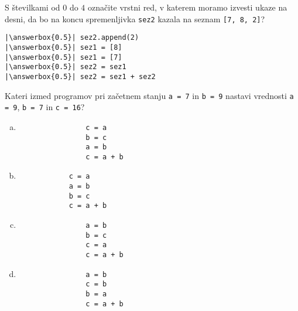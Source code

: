 \documentclass[arhiv, 10pt]{../izpit}
\newcommand{\inlinepy}[1]{\texttt{#1}}
\newcommand{\answerbox}[1]{\framebox{\vphantom{\large M}\hspace{#1cm}}}
\begin{document}
        \naloga*
        \begin{multicols}{2}
        \noindent 
        S številkami od $0$ do $4$ označite vrstni red, v katerem moramo izvesti ukaze na desni, da bo na koncu spremenljivka \inlinepy{sez2} kazala na seznam \inlinepy{[7, 8, 2]}?
    
        \columnbreak
        \noindent
        \begin{verbatim}
|\answerbox{0.5}| sez2.append(2)
|\answerbox{0.5}| sez1 = [8]
|\answerbox{0.5}| sez1 = [7]
|\answerbox{0.5}| sez2 = sez1
|\answerbox{0.5}| sez2 = sez1 + sez2

        \end{verbatim}
        \end{multicols}
    
            
        \naloga*
        
        Kateri izmed programov pri začetnem stanju
            \inlinepy{a = 7} in
            \inlinepy{b = 9}
        nastavi vrednosti
            \inlinepy{a = 9},
            \inlinepy{b = 7} in
            \inlinepy{c = 16}?
    
        \begin{multicols}{4}
        \begin{enumerate}[(a)]
\item 
                \begin{verbatim}
                c = a
                b = c
                a = b
                c = a + b
                \end{verbatim}
            
\item 
            \begin{verbatim}
            c = a
            a = b
            b = c
            c = a + b
            \end{verbatim}
        
\item 
                \begin{verbatim}
                a = b
                b = c
                c = a
                c = a + b
                \end{verbatim}
            
\item 
                \begin{verbatim}
                a = b
                c = b
                b = a
                c = a + b
                \end{verbatim}
            
\end{enumerate}

        \end{multicols}
    
\end{document}
